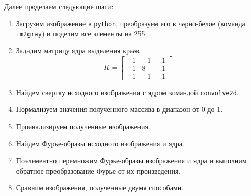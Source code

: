 \documentclass[a4paper, 12pt]{article}
\begin{document}
    Далее проделаем следующие шаги:
    \begin{enumerate}
        \item Загрузим изображение в \texttt{python}, преобразуем его в чeрно-белое (команда \texttt{im2gray}) и поделим все элементы на 255.
        \item Зададим матрицу ядра выделения краeв
        $$
        K=
        \begin{bmatrix}
            -1 &-1 &-1\\
            -1 &8 &-1\\
            -1 &-1 &-1
        \end{bmatrix}
        $$
        \item Найдем свертку исходного изображения с ядром командой \texttt{convolve2d}.
        \item Нормализуем значения полученного массива в диапазон от 0 до 1.
        \item Проанализируем полученные изображения.
        \item Найдем Фурье-образы исходного изображения и ядра.
        \item Поэлементно перемножим Фурье-образы изображения и ядра и выполним обратное преобразование Фурье от их произведения.
        \item Сравним изображения, полученные двумя способами.
    \end{enumerate}
\end{document}
